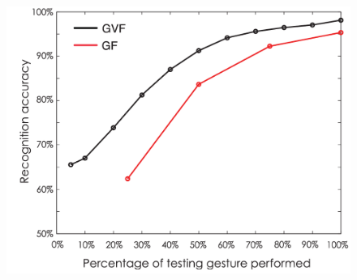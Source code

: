 \documentclass{beamer}
\begin{document}
\begin{frame}
\begin{columns}
\begin{column}{.5\textwidth}
\begin{figure}
\includegraphics[width=\linewidth]{../Bilder/Fig5}
\label{fig:Fig5}
\end{figure}
\end{column}
\end{columns}
\end{frame}
\end{document}
